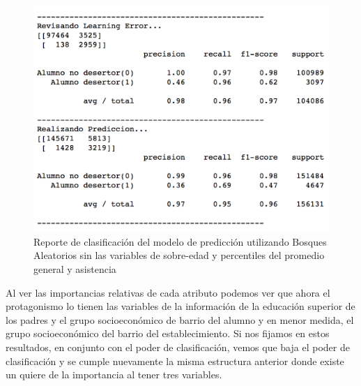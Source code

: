 \begin{figure}[H]
  \centering
    \includegraphics[trim=0cm 0cm 0cm 0cm,scale=0.65]{Figuras/7AnalisisResultado/clas-parcial.png}
      \caption{Reporte de clasificación del modelo de predicción utilizando Bosques Aleatorios sin las variables de sobre-edad y percentiles del promedio general y asistencia}
    \label{fig:clas-parcial}
\end{figure}

Al ver las importancias relativas de cada atributo podemos ver que ahora el protagonismo lo tienen las variables de la información de la educación superior de los padres y el grupo socioeconómico de barrio del alumno y en menor medida, el grupo socioeconómico del barrio del establecimiento. Si nos fijamos en estos resultados, en conjunto con el poder de clasificación, vemos que baja el poder de clasificación y se cumple nuevamente la misma estructura anterior donde existe un quiere de la importancia al tener tres variables. 

